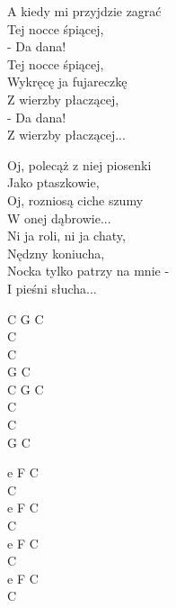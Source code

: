 \begin{text}
A kiedy mi przyjdzie zagrać\\
Tej nocce śpiącej,\\
- Da dana!\\
Tej nocce śpiącej,\\
Wykręcę ja fujareczkę\\
Z wierzby płaczącej,\\
- Da dana!\\
Z wierzby płaczącej...

Oj, polecąż z niej piosenki\\
Jako ptaszkowie,\\
Oj, rozniosą ciche szumy\\
W onej dąbrowie...\\
Ni ja roli, ni ja chaty,\\
Nędzny koniucha,\\
Nocka tylko patrzy na mnie -\\
I pieśni słucha...
\end{text}
\begin{chord}
    C G C\\
    C\\
    C\\
    G C\\
    C G C\\
    C\\
    C\\
    G C

    e F C\\
    C\\
    e F C\\
    C\\
    e F C\\
    C\\
    e F C\\
    C
\end{chord}